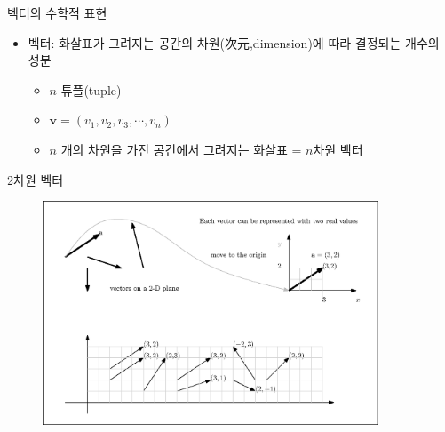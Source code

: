 \begin{frame}{벡터의 수학적 표현}

\begin{itemize}
\item 벡터: 화살표가 그려지는 공간의 차원(次元,dimension)에 따라 결정되는 개수의 성분
	\begin{itemize}
	\item $n$-튜플(tuple)
	\item $\mathbf v = ( v_1 , v_2 , v_3, \cdots , v_n )$
	\item $n$ 개의 차원을 가진 공간에서 그려지는 화살표 = $n$차원 벡터
	\end{itemize}
\end{itemize}

\end{frame}


\begin{frame}{2차원 벡터}

\begin{figure}[h!]
\includegraphics[width=10cm]{Math_vector/2dVectors.eps}
\end{figure}
\end{frame}


